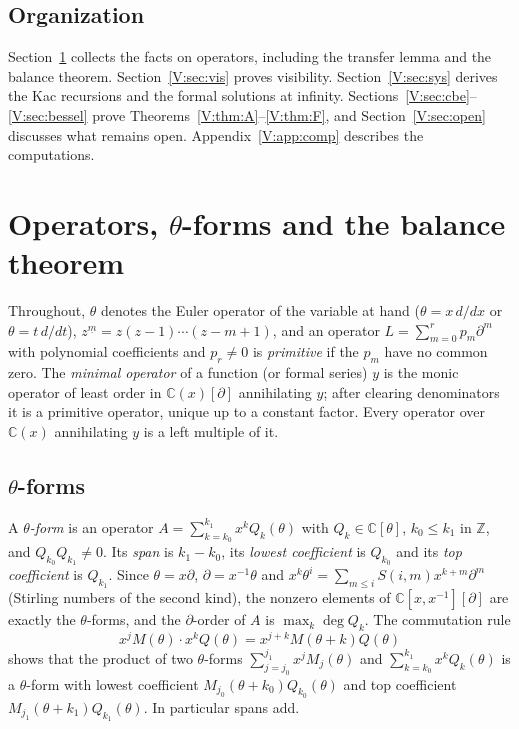 \documentclass[11pt,a4paper]{article}
\theoremstyle{definition}
\theoremstyle{remark}
\newcommand{\C}{\mathbb C}
\newcommand{\Z}{\mathbb Z}
\newcommand{\ff}[2]{#1^{\underline{#2}}}
\numberwithin{equation}{section}
\begin{document}
\subsection*{Organization}
Section~\ref{V:sec:ops} collects the facts on operators, including the transfer lemma and the balance theorem. Section~\ref{V:sec:vis} proves visibility. Section~\ref{V:sec:sys} derives the Kac recursions and the formal solutions at infinity. Sections~\ref{V:sec:cbe}--\ref{V:sec:bessel} prove Theorems~\ref{V:thm:A}--\ref{V:thm:F}, and Section~\ref{V:sec:open} discusses what remains open. Appendix~\ref{V:app:comp} describes the computations.
\section{Operators, \texorpdfstring{$\theta$}{theta}-forms and the balance theorem}\label{V:sec:ops}

Throughout, $\theta$ denotes the Euler operator of the variable at hand ($\theta=x\,d/dx$ or $\theta=t\,d/dt$), $\ff{z}{m}=z(z-1)\cdots(z-m+1)$, and an operator $L=\sum_{m=0}^{r}p_m\partial^m$ with polynomial coefficients and $p_r\ne0$ is \emph{primitive} if the $p_m$ have no common zero. The \emph{minimal operator} of a function (or formal series) $y$ is the monic operator of least order in $\C(x)[\partial]$ annihilating $y$; after clearing denominators it is a primitive operator, unique up to a constant factor. Every operator over $\C(x)$ annihilating $y$ is a left multiple of it.

\subsection{\texorpdfstring{$\theta$}{theta}-forms}
A \emph{$\theta$-form} is an operator $A=\sum_{k=k_0}^{k_1}x^kQ_k(\theta)$ with $Q_k\in\C[\theta]$, $k_0\le k_1$ in $\Z$, and $Q_{k_0}Q_{k_1}\ne0$. Its \emph{span} is $k_1-k_0$, its \emph{lowest coefficient} is $Q_{k_0}$ and its \emph{top coefficient} is $Q_{k_1}$. Since $\theta=x\partial$, $\partial=x^{-1}\theta$ and $x^k\theta^i=\sum_{m\le i}S(i,m)x^{k+m}\partial^m$ (Stirling numbers of the second kind), the nonzero elements of $\C[x,x^{-1}][\partial]$ are exactly the $\theta$-forms, and the $\partial$-order of $A$ is $\max_k\deg Q_k$. The commutation rule
\begin{equation}\label{V:eq:mult}
x^jM(\theta)\cdot x^kQ(\theta)=x^{j+k}M(\theta+k)Q(\theta)
\end{equation}
shows that the product of two $\theta$-forms $\sum_{j=j_0}^{j_1}x^jM_j(\theta)$ and $\sum_{k=k_0}^{k_1}x^kQ_k(\theta)$ is a $\theta$-form with lowest coefficient $M_{j_0}(\theta+k_0)Q_{k_0}(\theta)$ and top coefficient $M_{j_1}(\theta+k_1)Q_{k_1}(\theta)$. In particular spans add.
\end{document}
